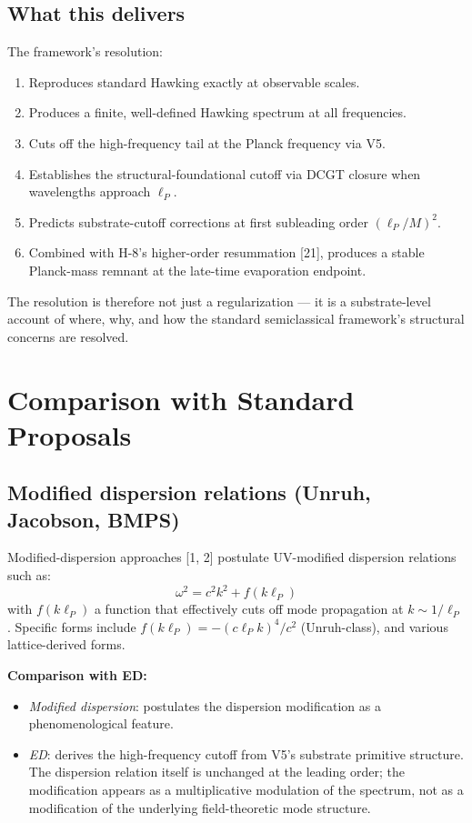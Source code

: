 \documentclass[11pt,a4paper]{article}
\begin{document}
\subsection{What this delivers}

The framework's resolution:
\begin{enumerate}[noitemsep]
\item Reproduces standard Hawking exactly at observable scales.
\item Produces a finite, well-defined Hawking spectrum at all frequencies.
\item Cuts off the high-frequency tail at the Planck frequency via V5.
\item Establishes the structural-foundational cutoff via DCGT closure when wavelengths approach $\ell_P$.
\item Predicts substrate-cutoff corrections at first subleading order $(\ell_P/M)^{2}$.
\item Combined with H-8's higher-order resummation [21], produces a stable Planck-mass remnant at the late-time evaporation endpoint.
\end{enumerate}

The resolution is therefore not just a regularization --- it is a substrate-level account of where, why, and how the standard semiclassical framework's structural concerns are resolved.

\section{Comparison with Standard Proposals}

\subsection{Modified dispersion relations (Unruh, Jacobson, BMPS)}

Modified-dispersion approaches [1, 2] postulate UV-modified dispersion relations such as:
\[
\omega^{2} = c^{2} k^{2} + f(k\ell_P)
\]
with $f(k\ell_P)$ a function that effectively cuts off mode propagation at $k \sim 1/\ell_P$. Specific forms include $f(k\ell_P) = -(c\ell_P k)^{4}/c^{2}$ (Unruh-class), and various lattice-derived forms.

\textbf{Comparison with ED:}
\begin{itemize}[noitemsep]
\item \emph{Modified dispersion}: postulates the dispersion modification as a phenomenological feature.
\item \emph{ED}: derives the high-frequency cutoff from V5's substrate primitive structure. The dispersion relation itself is unchanged at the leading order; the modification appears as a multiplicative modulation of the spectrum, not as a modification of the underlying field-theoretic mode structure.
\end{itemize}
\end{document}

